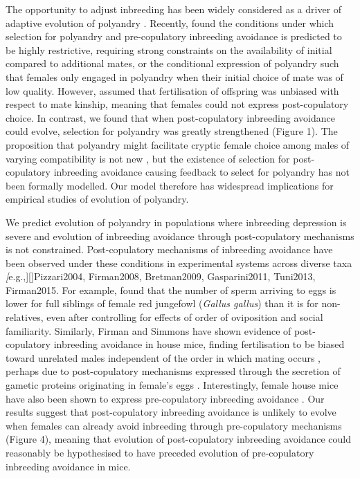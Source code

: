 \documentclass[10pt,letterpaper]{article}
\begin{document}
The opportunity to adjust inbreeding has been widely considered as a driver of adaptive evolution of polyandry \cite[][]{Tregenza2002, Foerster2003, Akcay2007, Varian-Ramos2012, Kingma2013, Lehtonen2015, Reid2014}. Recently, \cite{Duthie} found the conditions under which selection for polyandry and pre-copulatory inbreeding avoidance is predicted to be highly restrictive, requiring strong constraints on the availability of initial compared to additional mates, or the conditional expression of polyandry such that females only engaged in polyandry when their initial choice of mate was of low quality. However, \cite{Duthie} assumed that fertilisation of offspring was unbiased with respect to mate kinship, meaning that females could not express post-copulatory choice. In contrast, we found that when post-copulatory inbreeding avoidance could evolve, selection for polyandry was greatly strengthened (Figure 1). The proposition that polyandry might facilitate cryptic female choice among males of varying compatibility is not new \cite[e.g.,][]{Zeh1997}, but the existence of selection for post-copulatory inbreeding avoidance causing feedback to select for polyandry has not been formally modelled. Our model therefore has widespread implications for empirical studies of evolution of polyandry. 

We predict evolution of polyandry in populations where inbreeding depression is severe and evolution of inbreeding avoidance through post-copulatory mechanisms is not constrained. Post-copulatory mechanisms of inbreeding avoidance have been observed under these conditions in experimental systems across diverse taxa \textit[e.g.,][]{Pizzari2004, Firman2008, Bretman2009, Gasparini2011, Tuni2013, Firman2015}. For example, \cite{Pizzari2004} found that the number of sperm arriving to eggs is lower for full siblings of female red jungefowl (\textit{Gallus gallus}) than it is for non-relatives, even after controlling for effects of order of oviposition and social familiarity. Similarly, Firman and Simmons \citeyearpar{Firman2008, Firman2015} have shown evidence of post-copulatory inbreeding avoidance in house mice, finding fertilisation to be biased toward unrelated males independent of the order in which mating occurs \cite[][]{Firman2008}, perhaps due to post-copulatory mechanisms expressed through the secretion of gametic proteins originating in female's eggs \cite[][]{Firman2015}. Interestingly, female house mice have also been shown to express pre-copulatory inbreeding avoidance  \cite[][]{Potts1991, Roberts2003}. Our results suggest that post-copulatory inbreeding avoidance is unlikely to evolve when females can already avoid inbreeding through pre-copulatory mechanisms (Figure 4), meaning that evolution of post-copulatory inbreeding avoidance could reasonably be hypothesised to have preceded evolution of pre-copulatory inbreeding avoidance in mice.  
\end{document}

